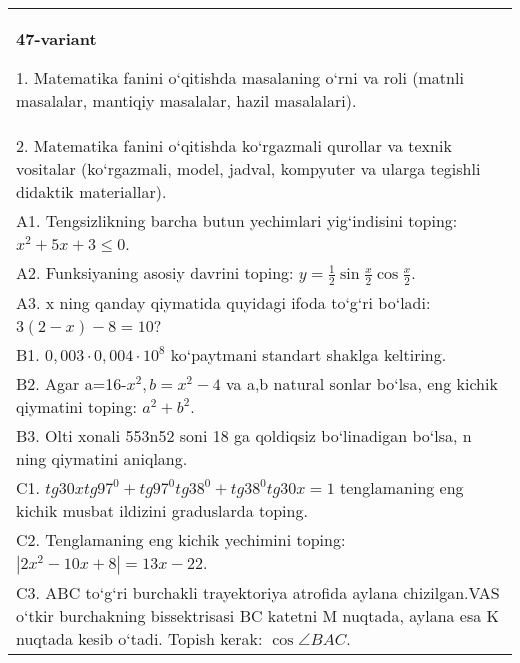 \documentclass{article}
\begin{document}
\begin{tabular}{m{17cm}}
\textbf{47-variant}

1. Matematika fanini o‘qitishda masalaning o‘rni va roli (matnli masalalar, mantiqiy masalalar, hazil masalalari). \\
2. Matematika fanini o‘qitishda ko‘rgazmali qurollar va texnik vositalar (ko‘rgazmali, model, jadval, kompyuter va ularga tegishli didaktik materiallar). \\
A1. Tengsizlikning barcha butun yechimlari yig‘indisini toping: \(x^2 + 5x + 3 \leq 0\). \\
A2. Funksiyaning asosiy davrini toping: \(y = \frac{1}{2}\sin{\frac{x}{2}\cos\frac{x}{2}}\). \\
A3. x ning qanday qiymatida quyidagi ifoda to‘g‘ri bo‘ladi: \(3 (2 - x) - 8 = 10\)? \\
B1. \(0,003 \cdot 0,004 \cdot 10^{8}\) ko‘paytmani standart shaklga keltiring. \\
B2. Agar a=16-\(x^2, b=x^2-4\) va a,b natural sonlar bo‘lsa, eng kichik qiymatini toping: \(a^2 + b^2\). \\
B3. Olti xonali 553n52 soni 18 ga qoldiqsiz bo‘linadigan bo‘lsa, n ning qiymatini aniqlang. \\
C1. \(tg30xtg97^{0} + tg97^{0}tg38^{0} + tg38^{0}tg30x = 1\) tenglamaning eng kichik musbat ildizini graduslarda toping. \\
C2. Tenglamaning eng kichik yechimini toping: \(\left| 2x^2 - 10x + 8 \right| = 13x - 22\). \\
C3. ABC to‘g‘ri burchakli trayektoriya atrofida aylana chizilgan.VAS o‘tkir burchakning bissektrisasi BC katetni M nuqtada, aylana esa K nuqtada kesib o‘tadi. Topish kerak: \(\cos\angle BAC\). \\

\end{tabular}
\vspace{1cm}
\end{document}
